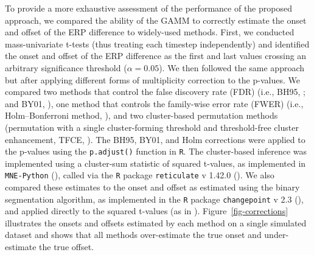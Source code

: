 \documentclass[
  doc,
  floatsintext,
  longtable,
  a4paper,
  nolmodern,
  notxfonts,
  notimes,
  colorlinks=true,linkcolor=blue,citecolor=blue,urlcolor=blue]{apa7}
\begin{document}
To provide a more exhaustive assessment of the performance of the
proposed approach, we compared the ability of the GAMM to correctly
estimate the onset and offset of the ERP difference to widely-used
methods. First, we conducted mass-univariate t-tests (thus treating each
timestep independently) and identified the onset and offset of the ERP
difference as the first and last values crossing an arbitrary
significance threshold (\(\alpha = 0.05\)). We then followed the same
approach but after applying different forms of multiplicity correction
to the p-values. We compared two methods that control the false
discovery rate (FDR) (i.e., BH95, ; and BY01, ), one method that controls the family-wise error rate
(FWER) (i.e., Holm--Bonferroni method, ), and two cluster-based permutation methods (permutation with a
single cluster-forming threshold and threshold-free cluster enhancement,
TFCE, ). The BH95,
BY01, and Holm corrections were applied to the p-values using the
\texttt{p.adjust()} function in \texttt{R}. The cluster-based inference
was implemented using a cluster-sum statistic of squared t-values, as
implemented in \texttt{MNE-Python}
(), called via the \texttt{R}
package \texttt{reticulate} v 1.42.0 (). We also compared these estimates to the onset and offset as
estimated using the binary segmentation algorithm, as implemented in the
\texttt{R} package \texttt{changepoint} v 2.3
(), and applied
directly to the squared t-values (as in
).
Figure~\ref{fig-corrections} illustrates the onsets and offsets
estimated by each method on a single simulated dataset and shows that
all methods over-estimate the true onset and under-estimate the true
offset.
\end{document}
